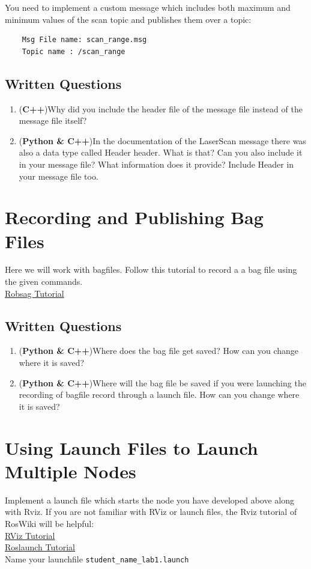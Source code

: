 \documentclass[letta4 paper]{article}
\numberwithin{equation}{section}
\newcommand{\0}{\mathbf{0}}
\begin{document}
	You need to implement a custom message which includes both maximum and minimum values of the scan topic and publishes them over a topic: 
	\begin{lstlisting}
	Msg File name: scan_range.msg
	Topic name : /scan_range
	\end{lstlisting}{}
	
	\subsection{Written Questions}
	\begin{enumerate}
		\item (\textbf{C++})Why did you include the header file of the message file instead of the message file itself?
		\item (\textbf{Python \& C++})In the documentation of the LaserScan message there was also a data type called Header header. What is that? Can you also include it in your message file? What information does it provide? Include Header in your message file too. 
	\end{enumerate}{}

	\section{Recording and Publishing Bag Files}
	Here we will work with bagfiles. Follow this tutorial to record a a bag file using the given commands. \\
	\href{http://wiki.ros.org/ROS/Tutorials/Recording%20and%20playing%20back%20data}{Robsag Tutorial}\\

	\subsection{Written Questions}
	\begin{enumerate}
		\item (\textbf{Python \& C++})Where does the bag file get saved? How can you change where it is saved? 
		\item (\textbf{Python \& C++})Where will the bag file be saved if you were launching the recording of bagfile record through a launch file. How can you change where it is saved?
	\end{enumerate}{}


	\section{Using Launch Files to Launch Multiple Nodes}
	Implement a launch file which starts the node you have developed above along with Rviz. If you are not familiar with RViz or launch files, the Rviz tutorial of RosWiki will be helpful:  \\
	\href{http://wiki.ros.org/rviz/Tutorials}{RViz Tutorial}\\
	\href{http://wiki.ros.org/roslaunch}{Roslaunch Tutorial}\\
	\noindent Name your launchfile \texttt{student\_name\_lab1.launch}
	
\end{document}
